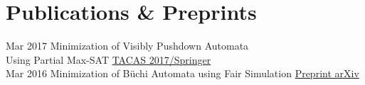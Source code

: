\documentclass[letterpaper]{twentysecondcv} %
\begin{document}
\newpage

\makeprofile %


\section{Publications \& Preprints}
\begin{twenty} %
	\twentyitem
    		{Mar 2017}
		{}
        		{Minimization of Visibly Pushdown Automata\\Using Partial Max-SAT}
        		{\href{https://link.springer.com/chapter/10.1007/978-3-662-54577-5_27}{TACAS 2017/Springer}}
        		{}
        		{}\\
        	\twentyitem
    		{Mar 2016}
		{}
        		{Minimization of Büchi Automata using Fair Simulation}
        		{\href{https://arxiv.org/abs/1603.01107}{Preprint arXiv}}
        		{}
        		{}\\
\end{twenty}

\end{document}
